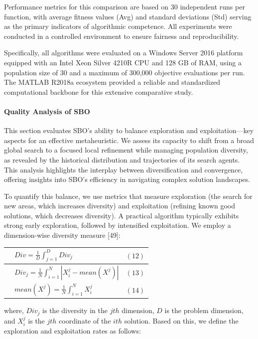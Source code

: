 \documentclass{article} %
\begin{document}
Performance metrics for this comparison are based on 30 independent runs per function, with average fitness values (Avg) and standard deviations (Std) serving as the primary indicators of algorithmic competence. All experiments were conducted in a controlled environment to ensure fairness and reproducibility. 

Specifically, all algorithms were evaluated on a Windows Server 2016 platform equipped with an Intel{\circledR} Xeon{\circledR} Silver 4210R CPU and 128 GB of RAM, using a population size of 30 and a maximum of 300,000 objective evaluations per run. The MATLAB R2018a ecosystem provided a reliable and standardized computational backbone for this extensive comparative study.


\paragraph{ Quality Analysis of SBO}

This section evaluates SBO's ability to balance exploration and exploitation---key aspects for an effective metaheuristic. We assess its capacity to shift from a broad global search to a focused local refinement while managing population diversity, as revealed by the historical distribution and trajectories of its search agents. This analysis highlights the interplay between diversification and convergence, offering insights into SBO's efficiency in navigating complex solution landscapes.

To quantify this balance, we use metrics that measure exploration (the search for new areas, which increases diversity) and exploitation (refining known good solutions, which decreases diversity). A practical algorithm typically exhibits strong early exploration, followed by intensified exploitation. We employ a dimension-wise diversity measure [49]:

\begin{tabular}{|p{0.4in}|p{3.1in}|p{0.4in}|} \hline 
 & $Div=\frac{1}{D}\int^D_{j=1}{Div_j}$ & $\left(\mathrm{12}\right)$ \\ \hline 
 & $Div_j=\frac{1}{N}\int^N_{i=1}{\left|X^j_i-mean\left(X^j\right)\right|}$ & $\left(\mathrm{13}\right)$ \\ \hline 
 & $mean\left(X^j\right)=\frac{1}{N}\int^N_{i=1}{X^j_i}$ & $\left(\mathrm{14}\right)$ \\ \hline 
\end{tabular}

where, $Div_j$ is the diversity in the $jth$ dimension, $D$ is the problem dimension, and $X^j_i$ is the $jth$ coordinate of the $ith$ solution. Based on this, we define the exploration and exploitation rates as follows:
\end{document}
